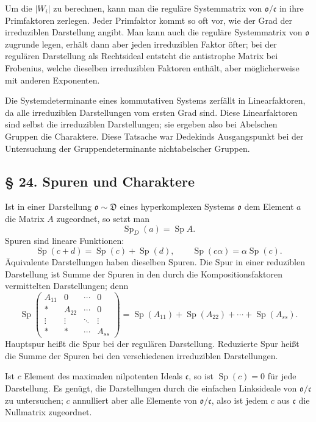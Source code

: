 \documentclass[11pt]{article}
\providecommand{\mo}{\mathfrak{o}}
\providecommand{\mc}{\mathfrak{c}}
\begin{document}
Um die $|W_i|$ zu berechnen, kann man die reguläre Systemmatrix von $\mo/\mc$ in ihre Primfaktoren zerlegen. Jeder Primfaktor kommt so oft vor, wie der Grad der irreduziblen Darstellung angibt. Man kann auch die reguläre Systemmatrix von $\mo$ zugrunde legen, erhält dann aber jeden irreduziblen Faktor öfter; bei der regulären Darstellung als Rechtsideal entsteht die antistrophe Matrix bei Frobenius, welche dieselben irreduziblen Faktoren enthält, aber möglicherweise mit anderen Exponenten.

Die Systemdeterminante eines kommutativen Systems zerfällt in Linearfaktoren, da alle irreduziblen Darstellungen vom ersten Grad sind. Diese Linearfaktoren sind selbst die irreduziblen Darstellungen; sie ergeben also bei Abelschen Gruppen die Charaktere. Diese Tatsache war Dedekinds Ausgangspunkt bei der Untersuchung der Gruppendeterminante nichtabelscher Gruppen.

\subsection*{§ 24. Spuren und Charaktere}
Ist in einer Darstellung $\mo\sim\mathfrak D$ eines hyperkomplexen Systems $\mo$ dem Element $a$ die Matrix $A$ zugeordnet, so setzt man
\[
        \operatorname{Sp}_D(a)=\operatorname{Sp} A.
\]
Spuren sind lineare Funktionen:
\[
        \operatorname{Sp}(c+d)=\operatorname{Sp}(c)+\operatorname{Sp}(d),
        \qquad
        \operatorname{Sp}(c\alpha)=\alpha\operatorname{Sp}(c).
\]
Äquivalente Darstellungen haben dieselben Spuren. Die Spur in einer reduziblen Darstellung ist Summe der Spuren in den durch die Kompositionsfaktoren vermittelten Darstellungen; denn
\[
        \operatorname{Sp}\begin{pmatrix}
        A_{11}&0&\cdots&0\\
        *&A_{22}&\cdots&0\\
        \vdots&\vdots&\ddots&\vdots\\
        *&*&\cdots&A_{ss}
        \end{pmatrix}
        =\operatorname{Sp}(A_{11})+\operatorname{Sp}(A_{22})+\cdots+\operatorname{Sp}(A_{ss}).
\]
Hauptspur heißt die Spur bei der regulären Darstellung. Reduzierte Spur heißt die Summe der Spuren bei den verschiedenen irreduziblen Darstellungen.

Ist $c$ Element des maximalen nilpotenten Ideals $\mc$, so ist $\operatorname{Sp}(c)=0$ für jede Darstellung. Es genügt, die Darstellungen durch die einfachen Linksideale von $\mo/\mc$ zu untersuchen; $c$ annulliert aber alle Elemente von $\mo/\mc$, also ist jedem $c$ aus $\mc$ die Nullmatrix zugeordnet.
\end{document}
